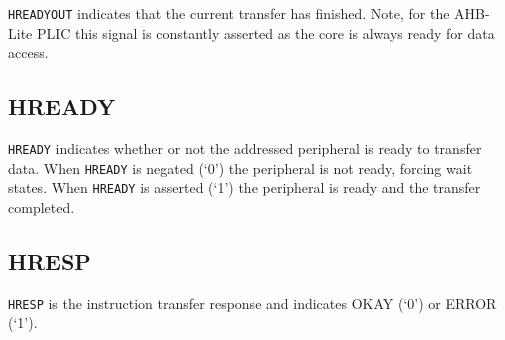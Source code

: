 \texttt{HREADYOUT} indicates that the current transfer has finished.
Note, for the AHB-Lite PLIC this signal is constantly asserted as the
core is always ready for data access.

\subsection{HREADY}

\texttt{HREADY} indicates whether or not the addressed peripheral is
ready to transfer data. When \texttt{HREADY} is negated (`0') the
peripheral is not ready, forcing wait states. When \texttt{HREADY} is
asserted (`1') the peripheral is ready and the transfer completed.

\subsection{HRESP}

\texttt{HRESP} is the instruction transfer response and indicates OKAY
(`0') or ERROR (`1').
